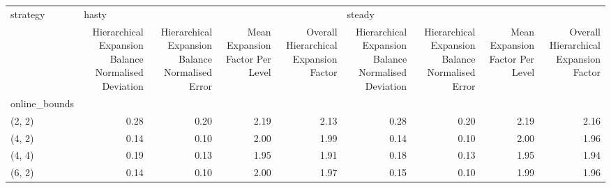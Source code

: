 \begin{tabular}{lrrrrrrrr}
\toprule
strategy & \multicolumn{4}{l}{hasty} & \multicolumn{4}{l}{steady} \\
{} & Hierarchical Expansion Balance Normalised Deviation & Hierarchical Expansion Balance Normalised Error & Mean Expansion Factor Per Level & Overall Hierarchical Expansion Factor & Hierarchical Expansion Balance Normalised Deviation & Hierarchical Expansion Balance Normalised Error & Mean Expansion Factor Per Level & Overall Hierarchical Expansion Factor \\
online\_bounds &                                                     &                                                 &                                 &                                       &                                                     &                                                 &                                 &                                       \\
\midrule
(2, 2)        &                                               0.28 &                                            0.20 &                            2.19 &                                  2.13 &                                               0.28 &                                            0.20 &                            2.19 &                                  2.16 \\
(4, 2)        &                                               0.14 &                                            0.10 &                            2.00 &                                  1.99 &                                               0.14 &                                            0.10 &                            2.00 &                                  1.96 \\
(4, 4)        &                                               0.19 &                                            0.13 &                            1.95 &                                  1.91 &                                               0.18 &                                            0.13 &                            1.95 &                                  1.94 \\
(6, 2)        &                                               0.14 &                                            0.10 &                            2.00 &                                  1.97 &                                               0.15 &                                            0.10 &                            1.99 &                                  1.96 \\

\end{tabular}
